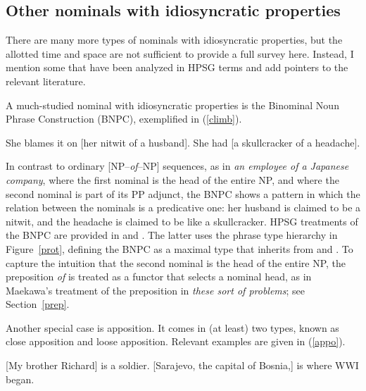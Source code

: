 \documentclass[output=paper
	        ,collection
	        ,collectionchapter
 	        ,biblatex
                ,babelshorthands
                ,newtxmath
                ,draftmode
                ,colorlinks, citecolor=brown
]{langscibook}
\begin{document}
\subsection{Other nominals with idiosyncratic properties} 
\label{other}


There are many more types of nominals with idiosyncratic properties,
but the allotted time and space are not sufficient to provide a full survey here. 
Instead, I mention some that have been analyzed in HPSG terms and add pointers 
to the relevant literature.    

A much-studied nominal with idiosyncratic properties is the Binominal Noun Phrase 
Construction (BNPC), exemplified in (\ref{climb}). 

\begin{exe}
\ex\label{climb}
\begin{xlist}
\ex  She blames it on [her nitwit of a husband]. 
\ex  She had [a skullcracker of a headache]. 
\end{xlist}
\end{exe}

\noindent
In contrast to ordinary [NP--\emph{of}--NP] sequences, 
as in \emph{an employee of a Japanese company}, where the 
first nominal is the head of the entire NP, and where the second 
nominal is part of its PP adjunct, the BNPC shows a pattern
in which the relation between the nominals is a predicative one: 
her husband is claimed to be a nitwit, and the headache is claimed to be 
like a skullcracker. HPSG treatments of the BNPC are provided in
\citet{KimSells14} and \citet{VanEynde18}. The latter uses 
the phrase type hierarchy in Figure~\ref{prot}, defining the BNPC as 
a maximal type that inherits from  and 
. To capture the intuition that the second
nominal is the head of the entire NP, the preposition \emph{of} is 
treated as a functor that selects a nominal head, as in Maekawa's treatment of 
the preposition in \emph{these sort of problems}; see Section~\ref{prep}. 

Another special case is apposition. It comes in (at least) two types, known as 
close apposition and loose apposition. Relevant examples are given in (\ref{appo}). 

\begin{exe} 
\ex\label{appo} 
\begin{xlist} 
\ex  {}[My brother Richard] is a soldier.  
\ex  {}[Sarajevo, the capital of Bosnia,] is where WWI began.
\end{xlist} 
\end{exe}
\end{document}
